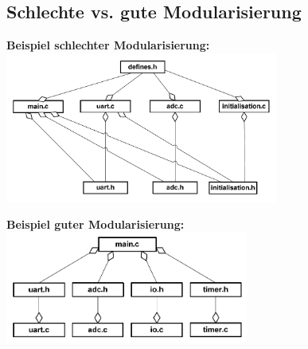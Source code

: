 \subsection{Schlechte vs. gute Modularisierung}
\begin{minipage}[t]{10cm}
\textbf{Beispiel schlechter Modularisierung:}\\
\includegraphics[width=9cm]{images/Modularisierung/SchlechtesBeispielModularisierung.png}
\end{minipage}
\begin{minipage}[t]{8cm}
\textbf{Beispiel guter Modularisierung:}\\
\includegraphics[width=8cm]{images/Modularisierung/GutesBeispielModularisierung.png}
\end{minipage}
